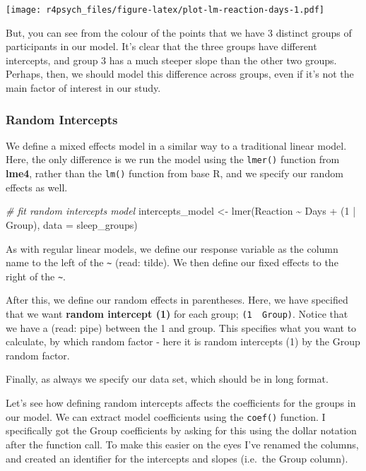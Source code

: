 \documentclass[
]{book}
\newenvironment{Shaded}{\begin{snugshade}}{\end{snugshade}}
\newcommand{\AttributeTok}[1]{\textcolor[rgb]{0.77,0.63,0.00}{#1}}
\newcommand{\CommentTok}[1]{\textcolor[rgb]{0.56,0.35,0.01}{\textit{#1}}}
\newcommand{\DecValTok}[1]{\textcolor[rgb]{0.00,0.00,0.81}{#1}}
\newcommand{\FunctionTok}[1]{\textcolor[rgb]{0.00,0.00,0.00}{#1}}
\newcommand{\NormalTok}[1]{#1}
\newcommand{\OtherTok}[1]{\textcolor[rgb]{0.56,0.35,0.01}{#1}}
\newcommand{\SpecialCharTok}[1]{\textcolor[rgb]{0.00,0.00,0.00}{#1}}
\begin{document}
\texttt{[image: r4psych\_files/figure-latex/plot-lm-reaction-days-1.pdf]}

But, you can see from the colour of the points that we have 3 distinct groups of participants in our model. It's clear that the three groups have different intercepts, and group 3 has a much steeper slope than the other two groups. Perhaps, then, we should model this difference across groups, even if it's not the main factor of interest in our study.

\hypertarget{random-intercepts}{%
\subsubsection{Random Intercepts}\label{random-intercepts}}

We define a mixed effects model in a similar way to a traditional linear model. Here, the only difference is we run the model using the \texttt{lmer()} function from \textbf{lme4}, rather than the \texttt{lm()} function from base R, and we specify our random effects as well.

\begin{Shaded}
\begin{Highlighting}[]
\CommentTok{\# fit random intercepts model}
\NormalTok{intercepts\_model }\OtherTok{\textless{}{-}} \FunctionTok{lmer}\NormalTok{(Reaction }\SpecialCharTok{\textasciitilde{}}\NormalTok{ Days }\SpecialCharTok{+}\NormalTok{ (}\DecValTok{1} \SpecialCharTok{|}\NormalTok{ Group), }\AttributeTok{data =}\NormalTok{ sleep\_groups)}
\end{Highlighting}
\end{Shaded}

As with regular linear models, we define our response variable as the column name to the left of the \texttt{\textasciitilde{}} (read: tilde). We then define our fixed effects to the right of the \texttt{\textasciitilde{}}.

After this, we define our random effects in parentheses. Here, we have specified that we want \textbf{random intercept (1)} for each group; \texttt{(1\ \textbar{}\ Group)}. Notice that we have a \texttt{\textbar{}} (read: pipe) between the 1 and group. This specifies what you want to calculate, by which random factor - here it is random intercepts (1) by the Group random factor.

Finally, as always we specify our data set, which should be in long format.

Let's see how defining random intercepts affects the coefficients for the groups in our model. We can extract model coefficients using the \texttt{coef()} function. I specifically got the Group coefficients by asking for this using the dollar notation after the function call. To make this easier on the eyes I've renamed the columns, and created an identifier for the intercepts and slopes (i.e.~the Group column).
\end{document}
